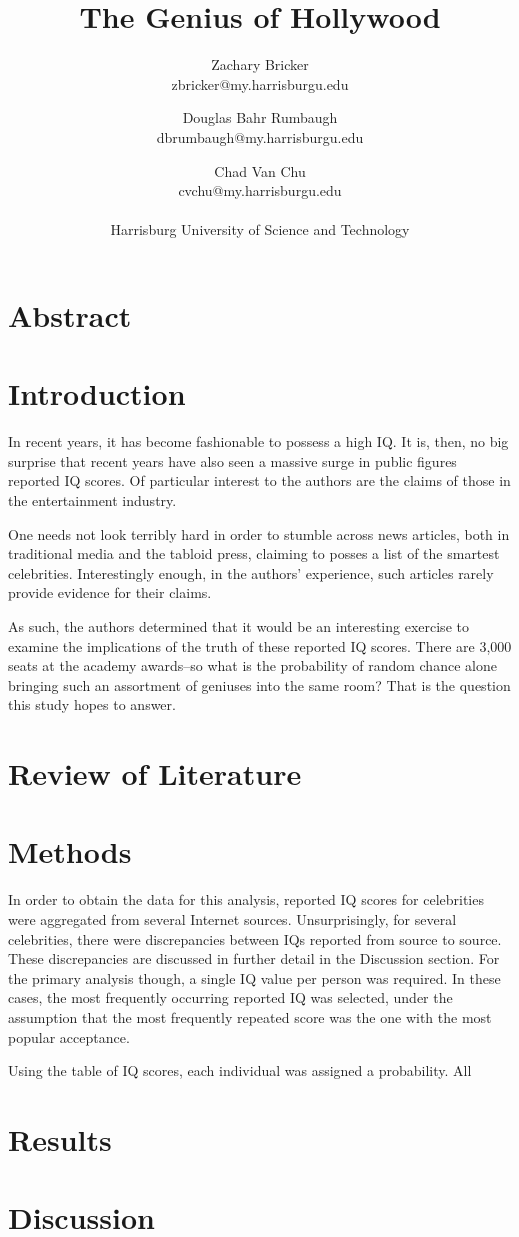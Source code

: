 \documentclass[12pt,letterpaper,titlepage,oneside,draft]{article}
\title{The Genius of Hollywood}
\author{
	Zachary Bricker  \\
	zbricker@my.harrisburgu.edu
	\and
	Douglas Bahr Rumbaugh \\
	dbrumbaugh@my.harrisburgu.edu
	\and 
	Chad Van Chu \\
	cvchu@my.harrisburgu.edu
	\\
	\\
	Harrisburg University of Science and Technology
}
\date{}
\begin{document}
\maketitle
\section*{Abstract}
\tableofcontents
\pagebreak


\section{Introduction}
In recent years, it has become fashionable to possess a high IQ. It is, then, no big surprise that recent years have also seen a massive surge in public figures reported IQ scores. Of particular interest to the authors are the claims of those in the entertainment industry.

One needs not look terribly hard in order to stumble across news articles, both in traditional media and the tabloid press, claiming to posses a list of the smartest celebrities. Interestingly enough, in the authors' experience, such articles rarely provide evidence for their claims.

As such, the authors determined that it would be an interesting exercise to examine the implications of the truth of these reported IQ scores. There are 3,000 seats at the academy awards--so what is the probability of random chance alone bringing such an assortment of geniuses into the same room? That is the question this study hopes to answer.
\section{Review of Literature}
\section{Methods}
In order to obtain the data for this analysis, reported IQ scores for celebrities were aggregated from several Internet sources. Unsurprisingly, for several celebrities, there were discrepancies between IQs reported from source to source. These discrepancies are discussed in further detail in the Discussion section. For the primary analysis though, a single IQ value per person was required. In these cases, the most frequently occurring reported IQ was selected, under the assumption that the most frequently repeated score was the one with the most popular acceptance.

Using the table of IQ scores, each individual was assigned a probability. All 
\section{Results}
\section{Discussion}
\end{document}
